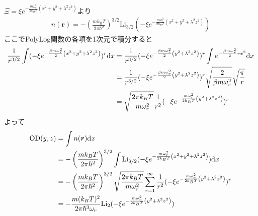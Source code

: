 \documentclass[11pt,a4j,notitlepage]{jreport}
\begin{document}
$\Xi=\xi e^{ - \frac{m \omega_{r}^{2}}{2k_{B}T}\left(x^{2}+y^{2}+\lambda^{2} z^{2}\right) }$より
\begin{align}
 	n(\bm{r}) 
 	= - \left( \frac{mk_{B}T}{2 \pi \hbar^2} \right)^{3/2} \mathrm{Li}_{3/2}(- \xi e^{ - \frac{m \omega_{r}^{2}}{2k_{B} T}\left(x^{2}+y^{2}+\lambda^{2} z^{2}\right) } )
	\label{eq:6}
\end{align}
ここでPolyLog関数の各項を1次元で積分すると
\begin{align}
 	\frac{1}{r^{3/2}}\int( - \xi e^{- \frac{\beta m \omega_{r}^{2}}{2}\left(x^{2}+y^{2}+\lambda^{2} z^{2}\right)} )^r \mathrm{d} x
 	& = \frac{1}{r^{3/2}} ( - \xi e^{- \frac{\beta m \omega_{r}^{2}}{2}\left(y^{2}+\lambda^{2} z^{2}\right)} )^r \int e^{- \frac{ \beta m \omega_{r}^{2}}{2} rx^{2} } \mathrm{d} x
 	\notag \\
 	& = \frac{1}{r^{3/2}} ( - \xi e^{- \frac{\beta m \omega_{r}^{2}}{2}\left(y^{2}+\lambda^{2} z^{2}\right)} )^r \sqrt{ \frac{2}{ \beta m \omega_{r}^{2}} } \sqrt{\frac{\pi}{r}}
 	\notag \\
 	& = \sqrt{ \frac{2\pi k_{B}T}{ m \omega_{r}^{2}} } \frac{1}{r^2} ( - \xi e^{- \frac{ m \omega_{r}^{2}}{2k_{B}T}\left(y^{2}+\lambda^{2} z^{2}\right)} )^r
	\label{eq:7}
\end{align}
よって
\begin{align}
 	\mathrm{OD}(y,z) 
 	& = \int n(\bm{r}) \mathrm{d} x
 	\notag \\
 	& = - \left( \frac{mk_{B}T}{2 \pi \hbar^2} \right)^{3/2} \int \mathrm{Li}_{3/2}(- \xi e^{ - \frac{m \omega_{r}^{2}}{2k_{B} T}\left(x^{2}+y^{2}+\lambda^{2} z^{2}\right) } ) \mathrm{d} x
 	\notag \\
 	& = - \left( \frac{mk_{B}T}{2 \pi \hbar^2} \right)^{3/2}\sqrt{ \frac{2\pi k_{B}T}{ m \omega_{r}^{2}} } \sum_{r=1}^{\infty} \frac{1}{r^2} ( - \xi e^{- \frac{ m \omega_{r}^{2}}{2k_{B}T}\left(y^{2}+\lambda^{2} z^{2}\right)} )^r
 	\notag \\
 	& = - \frac{m(k_{B}T)^2}{2 \pi \hbar^3 \omega_{r} } \mathrm{Li}_{2}(- \xi e^{ - \frac{m \omega_{r}^{2}}{2k_{B} T}\left(y^{2}+\lambda^{2} z^{2}\right) } )
	\label{eq:8}
\end{align}
\end{document}
